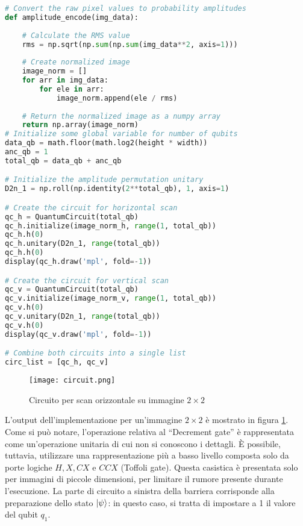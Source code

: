 \begin{lstlisting}[language=Python, 
    caption={Codice Python per creazione del circuito orizzontale}, label=cod:circuit]
# Convert the raw pixel values to probability amplitudes
def amplitude_encode(img_data):
    
    # Calculate the RMS value
    rms = np.sqrt(np.sum(np.sum(img_data**2, axis=1)))
    
    # Create normalized image
    image_norm = []
    for arr in img_data:
        for ele in arr:
            image_norm.append(ele / rms)
        
    # Return the normalized image as a numpy array
    return np.array(image_norm)
# Initialize some global variable for number of qubits
data_qb = math.floor(math.log2(height * width))
anc_qb = 1
total_qb = data_qb + anc_qb

# Initialize the amplitude permutation unitary
D2n_1 = np.roll(np.identity(2**total_qb), 1, axis=1)

# Create the circuit for horizontal scan
qc_h = QuantumCircuit(total_qb)
qc_h.initialize(image_norm_h, range(1, total_qb))
qc_h.h(0)
qc_h.unitary(D2n_1, range(total_qb))
qc_h.h(0)
display(qc_h.draw('mpl', fold=-1))

# Create the circuit for vertical scan
qc_v = QuantumCircuit(total_qb)
qc_v.initialize(image_norm_v, range(1, total_qb))
qc_v.h(0)
qc_v.unitary(D2n_1, range(total_qb))
qc_v.h(0)
display(qc_v.draw('mpl', fold=-1))

# Combine both circuits into a single list
circ_list = [qc_h, qc_v]
\end{lstlisting} 

\begin{figure}[ht]
    \texttt{[image: circuit.png]}
    \caption{Circuito per scan orizzontale su immagine $2 \times 2$}
    \label{fig:circuit}
\end{figure}

L'output dell'implementazione per un'immagine $2 \times 2$ è mostrato in figura \ref{fig:circuit}.
Come si può notare, l'operazione relativa al ``Decrement gate'' è 
rappresentata come un'operazione unitaria di cui non si conoscono i dettagli.
È possibile, tuttavia, utilizzare una rappresentazione più a basso livello 
composta solo da porte logiche $H, X, CX$ e $CCX$ (Toffoli gate).
Questa casistica è presentata solo per immagini di piccole dimensioni, per limitare il 
rumore presente durante l'esecuzione. La parte di circuito a sinistra della barriera
corrisponde alla preparazione dello stato $\lvert\psi\rangle$: in questo caso, si tratta 
di impostare a 1 il valore del qubit $q_1$.

